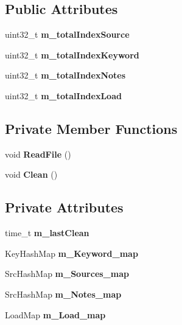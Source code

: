 \subsection*{Public Attributes}
\begin{DoxyCompactItemize}
\item 
uint32\_\-t {\bfseries m\_\-totalIndexSource}\label{classKademlia_1_1CIndexed_a5e6f7ef68df953d780313c4306c44dbf}

\item 
uint32\_\-t {\bfseries m\_\-totalIndexKeyword}\label{classKademlia_1_1CIndexed_aec94cae1a706d508963aa446221d90ac}

\item 
uint32\_\-t {\bfseries m\_\-totalIndexNotes}\label{classKademlia_1_1CIndexed_a582ed0ef87756aa3acc61cbb2b9e161d}

\item 
uint32\_\-t {\bfseries m\_\-totalIndexLoad}\label{classKademlia_1_1CIndexed_abefc8344fef41a0b5a0310d2c753bc30}

\end{DoxyCompactItemize}
\subsection*{Private Member Functions}
\begin{DoxyCompactItemize}
\item 
void {\bfseries ReadFile} ()\label{classKademlia_1_1CIndexed_abdd8a3ef2c62246fa6cd8d68cdbd4ce1}

\item 
void {\bfseries Clean} ()\label{classKademlia_1_1CIndexed_ae7847c464d3214a9d567c9c78000a4b0}

\end{DoxyCompactItemize}
\subsection*{Private Attributes}
\begin{DoxyCompactItemize}
\item 
time\_\-t {\bfseries m\_\-lastClean}\label{classKademlia_1_1CIndexed_ae842865bec5fd5757449e232276eec9f}

\item 
KeyHashMap {\bfseries m\_\-Keyword\_\-map}\label{classKademlia_1_1CIndexed_a64713929ee2f9b8241651abdfee9f32f}

\item 
SrcHashMap {\bfseries m\_\-Sources\_\-map}\label{classKademlia_1_1CIndexed_a7e5d33ad0081d18b40ac454cb55fe208}

\item 
SrcHashMap {\bfseries m\_\-Notes\_\-map}\label{classKademlia_1_1CIndexed_a39733d2ce004812db7a57977f7f07af1}

\item 
LoadMap {\bfseries m\_\-Load\_\-map}\label{classKademlia_1_1CIndexed_a778511ecb1b73e9d6d83c478ab812a29}

\end{DoxyCompactItemize}
